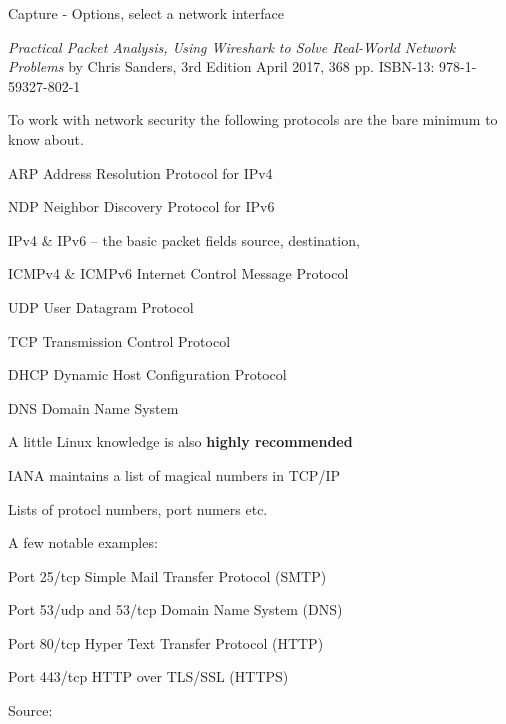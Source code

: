 \documentclass[Screen16to9,17pt]{foils}
\begin{document}
\centerline{Capture - Options, select a network interface}
\centerline{}









\emph{Practical Packet Analysis,
Using Wireshark to Solve Real-World Network Problems}
by Chris Sanders, 3rd Edition
April 2017, 368 pp.
ISBN-13:
978-1-59327-802-1




To work with network security the following protocols are the bare minimum to know about.

\begin{list2}
\item ARP Address Resolution Protocol for IPv4
\item NDP Neighbor Discovery Protocol for IPv6
\item IPv4 \& IPv6 -- the basic packet fields source, destination,
\item ICMPv4 \& ICMPv6 Internet Control Message Protocol
\item UDP User Datagram Protocol
\item TCP Transmission Control Protocol
\item DHCP Dynamic Host Configuration Protocol
\item DNS Domain Name System
\end{list2}

\centerline{A little Linux knowledge is also {\bf highly recommended}}




\begin{list1}
\item IANA maintains a list of magical numbers in TCP/IP
\item Lists of protocl numbers, port numers etc.
\item A few notable examples:
\begin{list2}
\item Port 25/tcp Simple Mail Transfer Protocol (SMTP)
\item Port 53/udp and 53/tcp Domain Name System (DNS)
\item Port 80/tcp Hyper Text Transfer Protocol (HTTP)
\item Port 443/tcp HTTP over TLS/SSL (HTTPS)
\end{list2}
\item Source: 
\end{list1}
\end{document}
